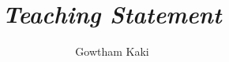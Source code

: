 \documentclass[11pt]{article}
\date{}
\begin{document}
\title{\itshape\color{MidnightBlue} Teaching Statement}

\author{Gowtham Kaki}

\maketitle




{
}

% 
% 
\end{document}
